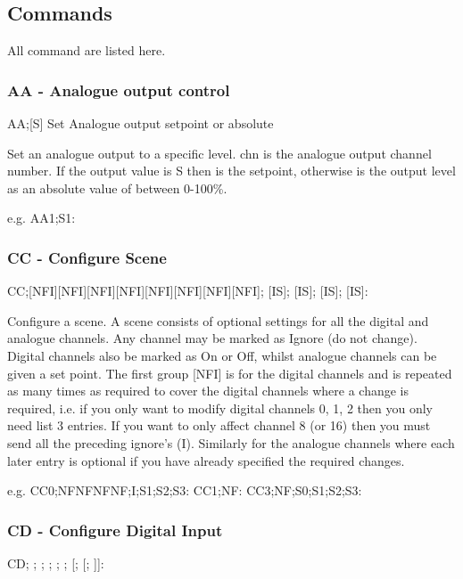 \subsection{Commands}

All command are listed here.

\subsubsection{AA - Analogue output control}
AA;[S\textbar{}]  Set Analogue output setpoint or absolute

Set an analogue output to a specific level.
chn is the analogue output channel number. If the output value is S then  is the setpoint,
otherwise  is the output level as an absolute value of between 0-100\%. 

e.g.
AA1;S1:

\subsubsection{CC - Configure Scene}
CC;[NFI][NFI][NFI][NFI][NFI][NFI][NFI][NFI]; [I\textbar{}S]; [I\textbar{}S]; [I\textbar{}S]; [I\textbar{}S]:

Configure a scene. A scene consists of optional settings for all the digital and analogue channels. Any channel
may be marked as Ignore (do not change). Digital channels also be marked as On or Off, whilst analogue channels
can be given a set point. The first group [NFI] is for the digital channels and is repeated as many times 
as required to cover the digital channels where a change is required, i.e. if you only want to modify 
digital channels 0, 1, 2 then you only need list 3 entries. If you want to only affect channel 8 (or 16) then
you must send all the preceding ignore's (I). Similarly for the analogue channels where each later entry is
optional if you have already specified the required changes.

e.g.
CC0;NFNFNFNF;I;S1;S2;S3:
CC1;NF:
CC3;NF;S0;S1;S2;S3:

\subsubsection{CD - Configure Digital Input}
CD; ; ; ; ; ;  [;  [; ]]:

